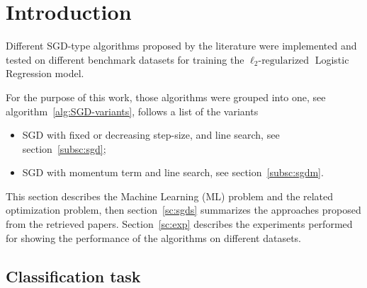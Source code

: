 \section{Introduction}\label{sc:intro}


Different SGD-type algorithms proposed by the literature were implemented and tested on different benchmark datasets for training the $\ell_2\text{-regularized}$ Logistic Regression model.

For the purpose of this work, those algorithms were grouped into one, see algorithm~\vref{alg:SGD-variants}, follows a list of the variants
\begin{itemize}
\item SGD with fixed or decreasing step-size, and line search, see section~\vref{subsc:sgd};
\item SGD with momentum term and line search, see section~\vref{subsc:sgdm}.
\end{itemize}


This section describes the Machine Learning (ML) problem and the related optimization problem, then section~\vref{sc:sgds} summarizes the approaches proposed from the retrieved papers. Section~\vref{sc:exp} describes the experiments performed for showing the performance of the algorithms on different datasets.

\subsection{Classification task}

